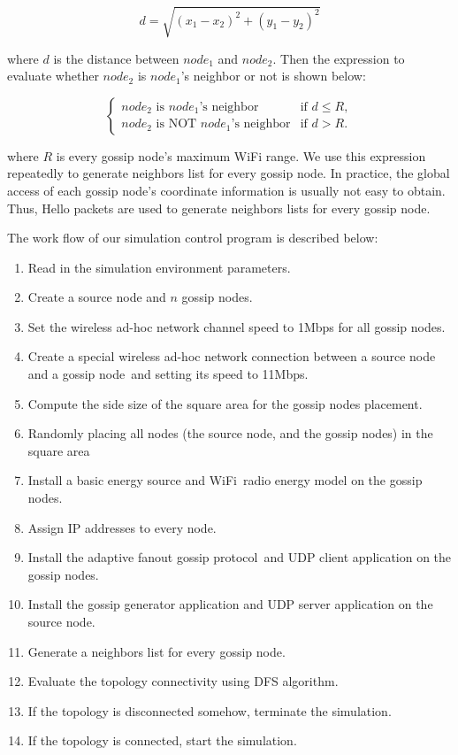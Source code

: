 \documentclass[onehalf,11pt]{beavtex}
\newcommand{\gp}{gossip protocol}
\newcommand{\gn}{gossip node}
\newcommand{\gns}{gossip nodes}
\newcommand{\wf}{WiFi}
\newcommand{\sn}{source node}
\begin{document}
\[d = \sqrt{(x_1 - x_2)^2+(y_1 - y_2)^2}\]

where $d$ is the distance between $node_1$ and $node_2$. Then the expression to evaluate whether $node_2$ is $node_1$'s neighbor or not is shown below:

\begin{equation*}
\left\{
\begin{array}{ll}
\mbox{$node_2$ is $node_1$'s neighbor} & \text{if } d \leq R,\\
\mbox{$node_2$ is NOT $node_1$'s neighbor} & \text{if } d > R.
\end{array} \right.
\end{equation*}

where $R$ is every \gn's maximum WiFi range. We use this expression repeatedly to generate neighbors list for every \gn. In practice, the global access of each \gn's coordinate information is usually not easy to obtain. Thus, Hello packets are used to generate neighbors lists for every \gn.

The work flow of our simulation control program is described below:

\begin{enumerate}
	\item Read in the simulation environment parameters. 
	\item Create a source node and $n$ gossip nodes.
	\item Set the wireless ad-hoc network channel speed to 1Mbps for all \gns.
	\item Create a special wireless ad-hoc network connection between a source node and a \gn ~and setting its speed to 11Mbps.
	\item Compute the side size of the square area for the gossip nodes placement.
	\item Randomly placing all nodes (the source node, and the gossip nodes) in the square area
	\item Install a basic energy source and \wf ~radio energy model on the \gns.
	\item Assign IP addresses to every node.
	\item Install the adaptive fanout \gp ~and UDP client application on the \gns.
	\item Install the gossip generator application and UDP server application on the \sn.
	\item Generate a neighbors list for every \gn.
	\item Evaluate the topology connectivity using DFS algorithm.
	\item If the topology is disconnected somehow, terminate the simulation.
	\item If the topology is connected, start the simulation.
\end{enumerate}
\end{document}
